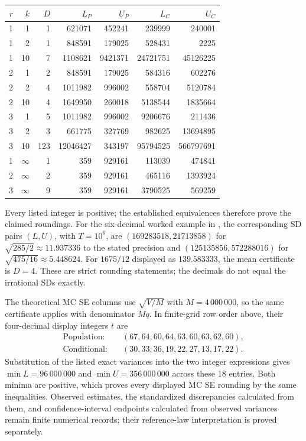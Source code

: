 \begin{center}\scriptsize
\setlength{\tabcolsep}{4pt}
\begin{tabular}{rr r rr rr}
\toprule
\(r\)&\(k\)&\(D\)&\(L_P\)&\(U_P\)&\(L_C\)&\(U_C\)\\\midrule
1&1&1&621071&452241&239999&240001\\
1&2&1&848591&179025&528431&2225\\
1&10&7&1108621&9421371&24721751&45126225\\
2&1&2&848591&179025&584316&602276\\
2&2&4&1011982&996002&558704&5120784\\
2&10&4&1649950&260018&5138544&1835664\\
3&1&5&1011982&996002&9206676&211436\\
3&2&3&661775&327769&982625&13694895\\
3&10&123&12046427&343197&95794525&566797691\\
1&\(\infty\)&1&359&929161&113039&474841\\
2&\(\infty\)&2&359&929161&465116&1393924\\
3&\(\infty\)&9&359&929161&3790525&569259\\\bottomrule
\end{tabular}
\end{center}
Every listed integer is positive; the established equivalences therefore
prove the claimed roundings. For the six-decimal worked example in
, the corresponding SD pairs \((L,U)\),
with \(T=10^6\), are \((169283518,21713858)\) for
\(\sqrt{285/2}\approx11.937336\) to the stated precision and
\((125135856,572288016)\) for \(\sqrt{475/16}\approx5.448624\).
For \(1675/12\) displayed as \(139.583333\), the mean certificate is
\(D=4\). These are strict rounding statements; the decimals do not equal
the irrational SDs exactly.

The theoretical MC SE columns use \(\sqrt{V/M}\) with
\(M=4\,000\,000\), so the same certificate applies with denominator
\(Mq\). In finite-grid row order above, their four-decimal display
integers \(t\) are
\[
 \begin{aligned}
  \text{Population:}\quad &(67,64,60,64,63,60,63,62,60),\\
  \text{Conditional:}\quad &(30,33,36,19,22,27,13,17,22).
 \end{aligned}
\]
Substitution of the listed exact variances into the two integer expressions gives
\(\min L=96\,000\,000\) and \(\min U=356\,000\,000\) across
these 18 entries. Both minima are positive, which proves every displayed
MC SE rounding by the same inequalities. Observed estimates, the
standardized discrepancies calculated from them, and confidence-interval
endpoints calculated from observed variances remain finite numerical
records; their reference-law interpretation is proved separately.

